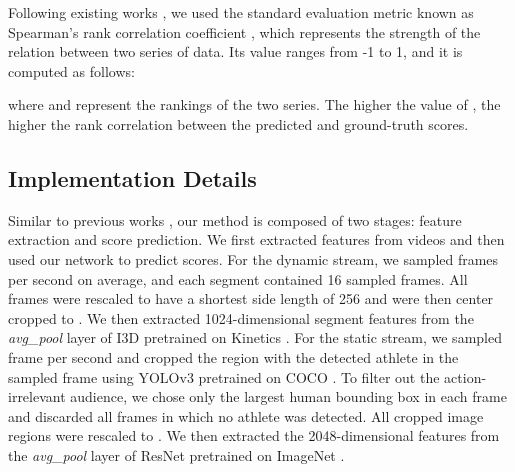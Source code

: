 \documentclass[sigconf]{acmart}
\begin{document}
\vspace{5pt}

Following existing works \cite{pirsiavash2014assessing,li2018end,xu2019learning}, we used the standard evaluation metric known as Spearman's rank correlation coefficient , which represents the strength of the relation between two series of data. Its value ranges from -1 to 1, and it is computed as follows:

where  and  represent the rankings of the two series. The higher the value of , the higher the rank correlation between the predicted and ground-truth scores.

\vspace{-0.1cm}
\subsection{Implementation Details}

Similar to previous works \cite{parmar2017learning,xu2019learning}, our method is composed of two stages: feature extraction and score prediction. We first extracted features from videos and then used our network to predict scores. For the dynamic stream, we sampled  frames per second on average, and each segment contained 16 sampled frames. All frames were rescaled to have a shortest side length of 256 and were then center cropped to . We then extracted 1024-dimensional segment features from the \emph{avg\_pool} layer of I3D pretrained on Kinetics \cite{carreira2017quo}. For the static stream, we sampled  frame per second and cropped the region with the detected athlete in the sampled frame using YOLOv3 \cite{redmon2018yolov3} pretrained on COCO \cite{lin2014microsoft}. To filter out the action-irrelevant audience, we chose only the largest human bounding box in each frame and discarded all frames in which no athlete was detected. All cropped image regions were rescaled to . We then extracted the 2048-dimensional features from the \emph{avg\_pool} layer of ResNet \cite{he2016deep} pretrained on ImageNet \cite{russakovsky2015imagenet}.

\vspace{5pt}
\end{document}

